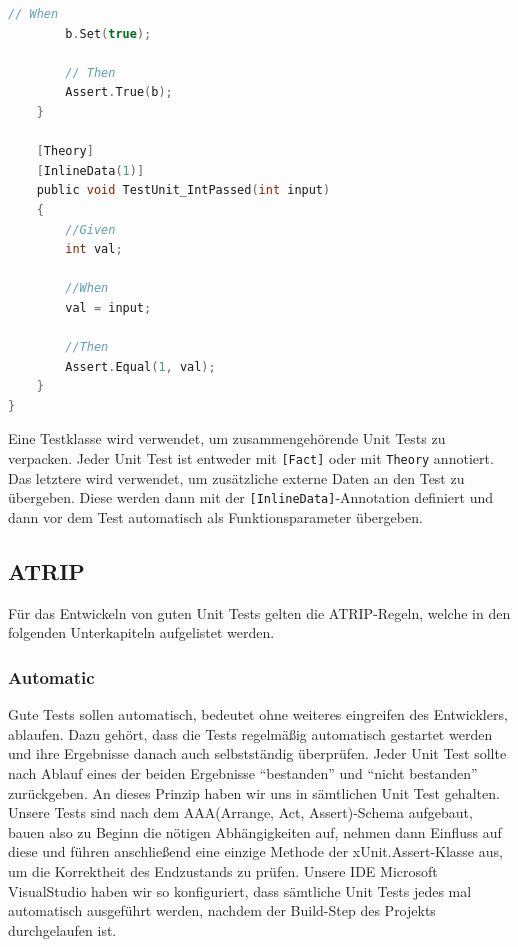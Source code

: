 \documentclass[
10pt, %
a4paper, %
oneside, %
headinclude,footinclude, %
BCOR5mm, %
]{scrartcl}
\begin{document}
\begin{onehalfspace}
\begin{lstlisting}[language=c, style=mStyle]
		// When
		b.Set(true);

		// Then
		Assert.True(b);
	}

	[Theory]
	[InlineData(1)]
	public void TestUnit_IntPassed(int input)
	{
		//Given
		int val;

		//When
		val = input;

		//Then
		Assert.Equal(1, val);
	}
}
\end{lstlisting}

Eine Testklasse wird verwendet, um zusammengehörende Unit Tests zu verpacken. Jeder Unit Test ist entweder mit \texttt{[Fact]} oder mit \texttt{Theory} annotiert. Das letztere wird verwendet, um zusätzliche externe Daten an den Test zu übergeben. Diese werden dann mit der \texttt{[InlineData]}-Annotation definiert und dann vor dem Test automatisch als Funktionsparameter übergeben.
\subsection{ATRIP}
Für das Entwickeln von guten Unit Tests gelten die ATRIP-Regeln, welche in den folgenden Unterkapiteln aufgelistet werden.
\subsubsection{Automatic}
Gute Tests sollen automatisch, bedeutet ohne weiteres eingreifen des Entwicklers, ablaufen. Dazu gehört, dass die Tests regelmäßig automatisch gestartet werden und ihre Ergebnisse danach auch selbstständig überprüfen. Jeder Unit Test sollte nach Ablauf eines der beiden Ergebnisse \enquote{bestanden} und \enquote{nicht bestanden} zurückgeben.
An dieses Prinzip haben wir uns in sämtlichen Unit Test gehalten. Unsere Tests sind nach dem AAA(Arrange, Act, Assert)-Schema aufgebaut, bauen also zu Beginn die nötigen Abhängigkeiten auf, nehmen dann Einfluss auf diese und führen anschließend eine einzige Methode der xUnit.Assert-Klasse aus, um die Korrektheit des Endzustands zu prüfen. Unsere IDE Microsoft VisualStudio haben wir so konfiguriert, dass sämtliche Unit Tests jedes mal automatisch ausgeführt werden, nachdem der Build-Step des Projekts durchgelaufen ist.


\end{onehalfspace}
\end{document}
